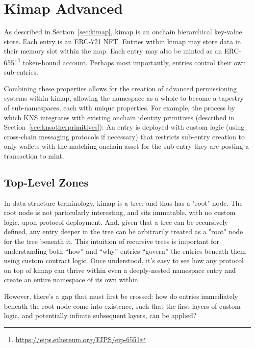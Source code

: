 \documentclass[runningheads]{llncs}
\begin{document}
\section{Kimap Advanced}
\label{sec:kimapadvanced}

As described in Section~\ref{sec:kimap}, kimap is an onchain hierarchical key-value store.
Each entry is an ERC-721 NFT.
Entries within kimap may store data in their memory slot within the map.
Each entry may also be minted as an ERC-6551\footnote{\url{https://eips.ethereum.org/EIPS/eip-6551}} token-bound account.
Perhaps most importantly, entries control their own sub-entries.

Combining these properties allows for the creation of advanced permissioning systems within kimap, allowing the namespace as a whole to become a tapestry of sub-namespaces, each with unique properties.
For example, the process by which KNS integrates with existing onchain identity primitives (described in Section~\ref{sec:knsotherprimitives}):
An entry is deployed with custom logic (using cross-chain messaging protocols if necessary) that restricts sub-entry creation to only wallets with the matching onchain asset for the sub-entry they are posting a transaction to mint.

\subsection{Top-Level Zones}

In data structure terminology, kimap is a tree, and thus has a "root" node.
The root node is not particularly interesting, and sits immutable, with no custom logic, upon protocol deployment.
And, given that a tree can be recursively defined, any entry deeper in the tree can be arbitrarily treated as a "root" node for the tree beneath it.
This intuition of recursive trees is important for understanding both ``how'' and ``why'' entries ``govern'' the entries beneath them using custom contract logic.
Once understood, it's easy to see how any protocol on top of kimap can thrive within even a deeply-nested namespace entry and create an entire namespace of its own within.

However, there's a gap that must first be crossed: how do entries immediately beneath the root node come into existence, such that the first layers of custom logic, and potentially infinite subsequent layers, can be applied?
\end{document}

